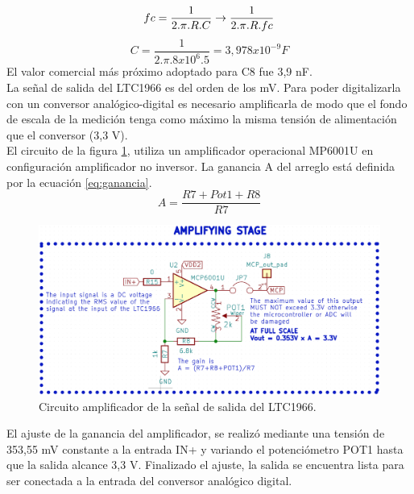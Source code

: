 \begin{equation}
	fc = \frac{1}{2.\pi.R.C}\rightarrow\frac{1}{2.\pi.R.fc}\\
\end{equation}
\begin{equation}
	\label{eq_capacitor_hpf}
	C=\frac{1}{2.\pi.{8x10^6}.5}=3,978x10^{-9} F
\end{equation}
El valor comercial más próximo adoptado para C8 fue 3,9 nF.\\
La señal de salida del LTC1966 es del orden de los mV. Para poder digitalizarla con un conversor analógico-digital es necesario amplificarla de modo que el fondo de escala de la medición tenga como máximo la misma tensión de alimentación que el conversor (3,3 V).\\
El circuito de la figura \ref{fig:ctoopamp}, utiliza un amplificador operacional MP6001U \citep{mcp6001} en configuración amplificador no inversor. La ganancia A del arreglo est\'{a} definida por la ecuación \ref{eq:ganancia}.
\begin{equation}
\label{eq:ganancia}
	A=\frac{R7+Pot1+R8}{R7}
\end{equation}

\begin{figure}[h!]
	\centering
	\includegraphics[width=1.0\linewidth]{Figures/cto_op_amp}
	\caption{Circuito amplificador de la señal de salida del LTC1966.}
	\label{fig:ctoopamp}
\end{figure}
El ajuste de la ganancia del amplificador, se realiz\'{o} mediante una tensión de 353,55 mV constante a la entrada IN+ y variando el potenciómetro POT1 hasta que la salida alcance 3,3 V. Finalizado el ajuste, la salida se encuentra lista para ser conectada a la entrada del conversor analógico digital.\\

